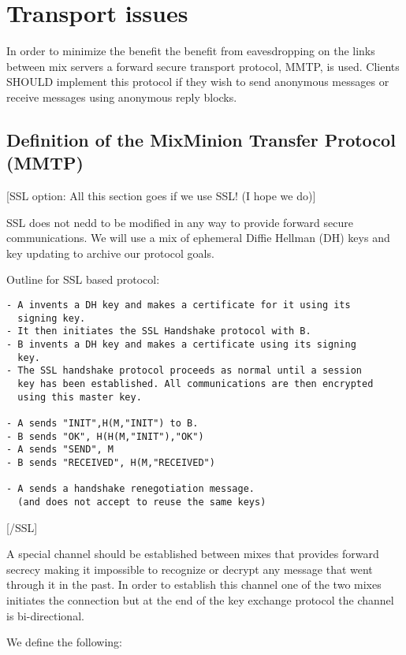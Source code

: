 \documentclass{article}
\begin{document}
\section{Transport issues}

In order to minimize the benefit the benefit from eavesdropping on the links 
between mix servers a forward secure transport protocol, MMTP, is used. 
Clients SHOULD implement this protocol if they wish to send anonymous 
messages or receive messages using anonymous reply blocks.

\subsection{Definition of the MixMinion Transfer Protocol (MMTP)}

[SSL option: All this section goes if we use SSL! (I hope we do)]

SSL does not nedd to be modified in any way to provide forward secure
communications. We will use a mix of ephemeral Diffie Hellman (DH)
keys and key updating to archive our protocol goals.

Outline for SSL based protocol:

\begin{verbatim}
- A invents a DH key and makes a certificate for it using its
  signing key.
- It then initiates the SSL Handshake protocol with B.
- B invents a DH key and makes a certificate using its signing
  key.
- The SSL handshake protocol proceeds as normal until a session
  key has been established. All communications are then encrypted
  using this master key.

- A sends "INIT",H(M,"INIT") to B.
- B sends "OK", H(H(M,"INIT"),"OK")
- A sends "SEND", M
- B sends "RECEIVED", H(M,"RECEIVED")

- A sends a handshake renegotiation message.
  (and does not accept to reuse the same keys)
\end{verbatim}

[/SSL]

A special channel should be established between mixes that provides
forward secrecy making it impossible to recognize or decrypt any
message that went through it in the past. In order to establish this
channel one of the two mixes initiates the connection but at the end
of the key exchange protocol the channel is bi-directional.

We define the following:
\end{document}
